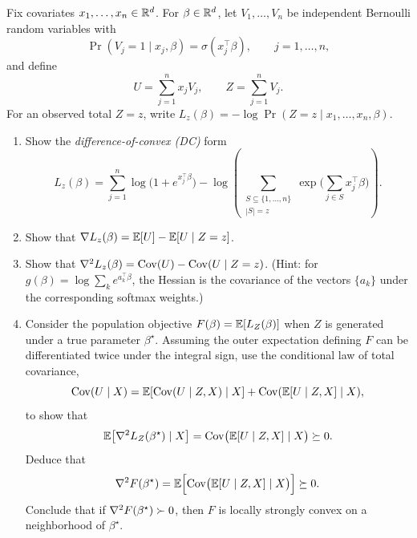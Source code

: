 \documentclass[11pt]{article}
\begin{document}
\begin{exercise}
\label{ex:eco-logistic-pop-local-convex}
Fix covariates $x_1,\dots,x_n\in\mathbb{R}^d$.
For $\beta\in\mathbb{R}^d$, let $V_1,\dots,V_n$ be independent Bernoulli random variables with
\[
\Pr(V_j=1\mid x_j,\beta)=\sigma(x_j^\top\beta),
\qquad j=1,\dots,n,
\]
and define
\[
U = \sum_{j=1}^n x_j V_j,
\qquad
Z = \sum_{j=1}^n V_j.
\]
For an observed total $Z=z$, write $L_z(\beta)=-\log \Pr(Z=z\mid x_1,\dots,x_n,\beta)$.
\begin{enumerate}[leftmargin=*]
  \item Show the \emph{difference-of-convex (DC)} form
  \[
  L_z(\beta)
  =\sum_{j=1}^n \log\bigl(1+e^{x_j^\top\beta}\bigr)
  -\log\left(\sum_{\substack{S\subseteq\{1,\dots,n\}\\|S|=z}} \exp\Big(\sum_{j\in S} x_j^\top\beta\Big)\right).
  \]
  \item Show that $\nabla L_z(\beta)=\mathbb{E}[U]-\mathbb{E}[U\mid Z=z]$.
  \item Show that $\nabla^2 L_z(\beta)=\mathrm{Cov}(U)-\mathrm{Cov}(U\mid Z=z)$.
  (Hint: for $g(\beta)=\log\sum_k e^{a_k^\top\beta}$, the Hessian is the covariance of the vectors $\{a_k\}$ under the corresponding softmax weights.)
  \item Consider the population objective $F(\beta)=\mathbb{E}[L_Z(\beta)]$ when $Z$ is generated under a true parameter $\beta^\star$.
  Assuming the outer expectation defining $F$ can be differentiated twice under the integral sign, use the conditional law of total covariance,
  \[
    \mathrm{Cov}(U\mid X)=\mathbb{E}[\mathrm{Cov}(U\mid Z,X)\mid X] + \mathrm{Cov}(\mathbb{E}[U\mid Z,X]\mid X),
  \]
  to show that
  \[
    \mathbb{E}\big[\nabla^2 L_Z(\beta^\star)\mid X\big]
    = \mathrm{Cov}\big(\mathbb{E}[U\mid Z,X]\mid X\big)\succeq 0.
  \]
  Deduce that
  \[
    \nabla^2 F(\beta^\star)
    = \mathbb{E}\Big[\mathrm{Cov}\big(\mathbb{E}[U\mid Z,X]\mid X\big)\Big]\succeq 0.
  \]
  Conclude that if $\nabla^2 F(\beta^\star)\succ 0$, then $F$ is locally strongly convex on a neighborhood of $\beta^\star$.
\end{enumerate}
\end{exercise}
\end{document}
